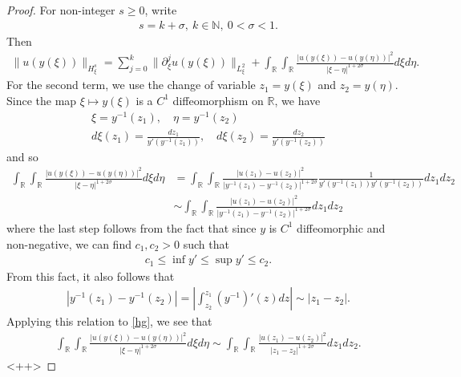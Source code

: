 \documentclass[12pt,reqno]{amsart}
\numberwithin{equation}{section}  %
\numberwithin{figure}{section}
\newcommand{\rr}{\mathbb{R}}
\newcommand{\p}{\partial}
\begin{document}
\begin{proof}
For non-integer $s \ge 0$, write
%
%
\begin{equation*}
\begin{split}
  s = k + \sigma, \ k \in \mathbb{N}, \ 0 < \sigma < 1. 
\end{split}
\end{equation*}
%
%
Then 
%
%
\begin{equation*}
\begin{split}
  \| u(y(\xi)) \|_{H^{s}_{\xi}} = \sum_{j = 0}^{k} \| \p_{\xi}^{j} u (y(\xi))
  \|_{L^{2}_{\xi}} + \int_{\rr} \int_{\rr} \frac{| u(y(\xi)) - u(y(\eta))
    |^{2}}{| \xi - \eta |^{1 + 2 \sigma}} d \xi d \eta.
\end{split}
\end{equation*}
%
%
For the second term, we use the change of variable $z_{1} = y(\xi)$ and $z_{2} = y(\eta)$. Since the map $\xi \mapsto y(\xi)$ is a $C^{1}$ diffeomorphism on $\rr$, we have
%
%
\begin{gather*}
   \xi= y^{-1}(z_{1}), \quad \eta = y^{-1}(z_{2})
  \\
   d \xi(z_{1}) = \frac{dz_{1}}{y'(y^{-1}(z_{1}))}, \quad d \xi(z_{2}) = \frac{dz_{2}}{y'(y^{-1}(z_{2}))}
\end{gather*}
%
%
and so
%
%
\begin{equation}
  \label{hg}
\begin{split}
\int_{\rr} \int_{\rr} \frac{| u(y(\xi)) - u(y(\eta))
    |^{2}}{| \xi - \eta |^{1 + 2 \sigma}} d \xi d \eta & = \int_{\rr} \int_{\rr}
    \frac{| u(z_{1}) - u(z_{2}) |^{2}}{| y^{-1}(z_{1}) - y^{-1}(z_{2}) |^{1 + 2
    \sigma}} \frac{1}{y'(y^{-1}(z_{1})) y'(y^{-1}(z_{2}))} d z_{1} d z_{2}
    \\
    & \sim \int_{\rr} \int_{\rr} \frac{| u(z_{1}) - u(z_{2}) |^{2}}{|
      y^{-1}(z_{1}) - y^{-1}(z_{2}) |^{1 + 2 \sigma}} d z_{1} dz_{2}
\end{split}
\end{equation}
%
%
where the last step follows from the fact that since $y$ is $C^{1}$
diffeomorphic  and non-negative, we can find $c_{1}, c_{2} > 0$ such that
%
%
\begin{equation*}
\begin{split}
  c_{1} \le \inf y' \le \sup y' \le c_{2}.
\end{split}
\end{equation*}
%
%
From this fact, it also follows that
%
%
\begin{equation*}
\begin{split}
  | y^{-1}(z_{1}) - y^{-1}(z_{2}) | = | \int_{z_{2}}^{z_{1}} (y^{-1})'(z) dz | \sim | z_{1} - z_{2} |.
\end{split}
\end{equation*}
%
%
Applying this relation to \eqref{hg}, we see that
%
%
\begin{equation*}
\begin{split}
\int_{\rr} \int_{\rr} \frac{| u(y(\xi)) - u(y(\eta))
    |^{2}}{| \xi - \eta |^{1 + 2 \sigma}} d \xi d \eta
    \sim 
\int_{\rr} \int_{\rr} \frac{| u(z_{1}) - u(z_{2}) |^{2}}{| z_{1} - z_{2} |^{1 + 2 \sigma}} d z_{1} dz_{2}.
\end{split}
\end{equation*}
%
%
<++>
\end{proof}
\end{document}

